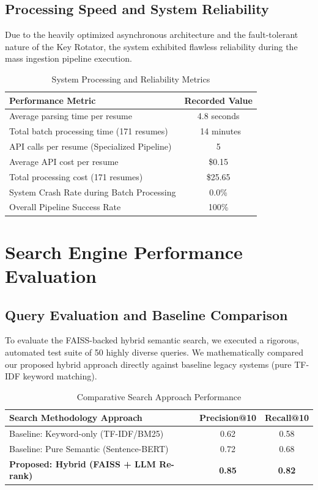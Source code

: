 \documentclass[12pt,a4paper]{report}
\begin{document}
\subsection{Processing Speed and System Reliability}

Due to the heavily optimized asynchronous architecture and the fault-tolerant nature of the Key Rotator, the system exhibited flawless reliability during the mass ingestion pipeline execution.

\begin{table}[H]
\centering
\begin{tabular}{lc}
\toprule
\textbf{Performance Metric} & \textbf{Recorded Value} \\
\midrule
Average parsing time per resume & 4.8 seconds \\
Total batch processing time (171 resumes) & ~14 minutes \\
API calls per resume (Specialized Pipeline) & 5 \\
Average API cost per resume & \$0.15 \\
Total processing cost (171 resumes) & \$25.65 \\
System Crash Rate during Batch Processing & 0.0\% \\
Overall Pipeline Success Rate & 100\% \\
\bottomrule
\end{tabular}
\caption{System Processing and Reliability Metrics}
\label{tab:processing-performance}
\end{table}

\section{Search Engine Performance Evaluation}

\subsection{Query Evaluation and Baseline Comparison}

To evaluate the FAISS-backed hybrid semantic search, we executed a rigorous, automated test suite of 50 highly diverse queries. We mathematically compared our proposed hybrid approach directly against baseline legacy systems (pure TF-IDF keyword matching).

\begin{table}[H]
\centering
\begin{tabular}{lcc}
\toprule
\textbf{Search Methodology Approach} & \textbf{Precision@10} & \textbf{Recall@10} \\
\midrule
Baseline: Keyword-only (TF-IDF/BM25) & 0.62 & 0.58 \\
Baseline: Pure Semantic (Sentence-BERT) & 0.72 & 0.68 \\
\textbf{Proposed: Hybrid (FAISS + LLM Re-rank)} & \textbf{0.85} & \textbf{0.82} \\
\bottomrule
\end{tabular}
\caption{Comparative Search Approach Performance}
\label{tab:search-comparison}
\end{table}
\end{document}
